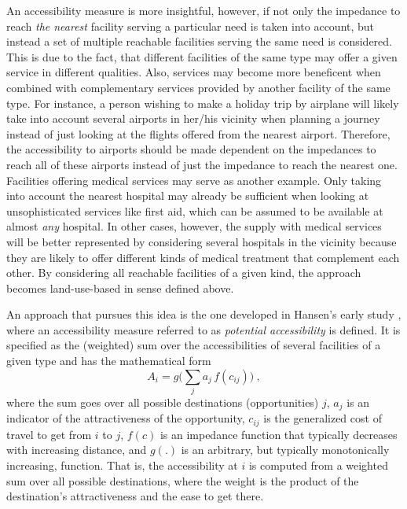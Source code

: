An accessibility measure is more insightful, however, if not only the impedance to reach \textit{the nearest} facility serving a particular need is taken into account, but instead a set of multiple reachable facilities serving the same need is considered. This is due to the fact, that different facilities of the same type may offer a given service in different qualities. Also, services may become more beneficent when combined with complementary services provided by another facility of the same type. For instance, a person wishing to make a holiday trip by airplane will likely take into account several airports in her/his vicinity when planning a journey instead of just looking at the flights offered from the nearest airport. Therefore, the accessibility to airports should be made dependent on the impedances to reach all of these airports instead of just the impedance to reach the nearest one. Facilities offering medical services may serve as another example. Only taking into account the nearest hospital may already be sufficient when looking at unsophisticated services like first aid, which can be assumed to be available at almost \textit{any} hospital. In other cases, however, the supply with medical services will be better represented by considering several hospitals in the vicinity because they are likely to offer different kinds of medical treatment that complement each other. By considering all reachable facilities of a given kind, the approach becomes land-use-based in sense defined above.

An approach that pursues this idea is the one developed in Hansen's early study \citep{Hansen-----------}, where an accessibility measure referred to as \textit{potential accessibility} is defined. It is specified as the (weighted) sum over the accessibilities of several facilities of a given type and has the mathematical form
\begin{equation}
A_i = g\Big( \sum_j a_j \, f(c_{ij}) \Big) \ ,
\label{eq:accessibility:basic}
\end{equation}
where the sum goes over all possible destinations (opportunities) $j$, $a_j$ is an indicator of the attractiveness of the opportunity, $c_{ij}$ is the generalized cost of travel to get from $i$ to $j$, $f(c)$ is an impedance function that typically decreases with increasing distance, and $g(.)$ is an arbitrary, but typically monotonically increasing, function. That is, the accessibility at $i$ is computed from a weighted sum over all possible destinations, where the weight is the product of the destination's attractiveness and the ease to get there.

